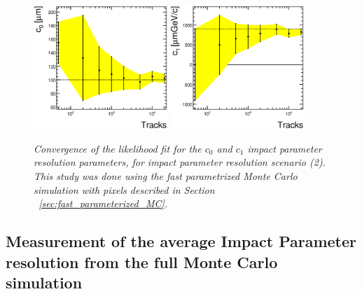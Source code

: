 \documentclass{cmspaper}
\begin{document}
\begin{figure}[hbtp]
  \begin{center}
    \includegraphics[width=0.45\textwidth]{figures/fxy_lhfit_c0_scen2.eps}
    \includegraphics[width=0.45\textwidth]{figures/fxy_lhfit_c1_scen2.eps}
   \caption{\it Convergence of the likelihood fit for the $c_0$ and  $c_1$ impact parameter resolution parameters, for impact parameter resolution 
scenario (2). This study was done using the fast parametrized Monte 
Carlo simulation with pixels described in Section ~\ref{sec:fast_parameterized_MC}.}
   \label{fig:performance2}
  \end{center}
\end{figure}



\clearpage

\subsection{\label{sec:ipresolfull}Measurement of the average Impact Parameter resolution from the full Monte Carlo simulation}
\end{document}
